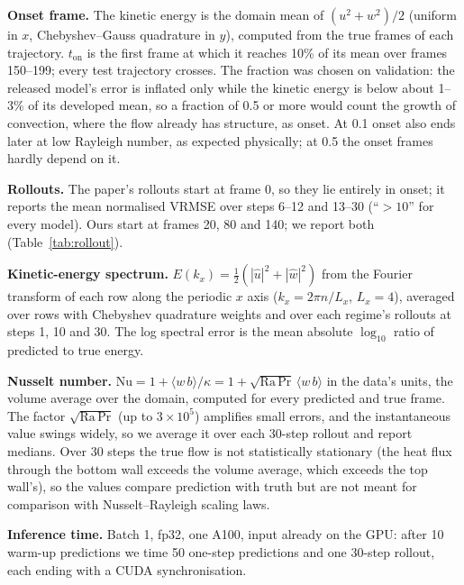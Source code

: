 \documentclass[11pt]{article}
\begin{document}
\textbf{Onset frame.} The kinetic energy is the domain mean of $(u^2+w^2)/2$ (uniform in $x$, Chebyshev--Gauss
quadrature in $y$), computed from the true frames of each trajectory. $t_{\mathrm{on}}$ is the first frame at which it
reaches 10\% of its mean over frames 150--199; every test trajectory crosses. The fraction was chosen on validation:
the released model's error is inflated only while the kinetic energy is below about 1--3\% of its developed mean, so a
fraction of 0.5 or more would count the growth of convection, where the flow already has structure, as onset. At 0.1
onset also ends later at low Rayleigh number, as expected physically; at 0.5 the onset frames hardly depend on it.

\textbf{Rollouts.} The paper's rollouts start at frame 0, so they lie entirely in onset; it reports the mean
normalised VRMSE over steps 6--12 and 13--30 (``$>10$'' for every model). Ours start at frames 20, 80 and 140; we
report both (Table~\ref{tab:rollout}).

\textbf{Kinetic-energy spectrum.} $E(k_x)=\tfrac12(|\hat u|^2+|\hat w|^2)$ from the Fourier transform of each row
along the periodic $x$ axis ($k_x=2\pi n/L_x$, $L_x=4$), averaged over rows with Chebyshev quadrature weights and
over each regime's rollouts at steps 1, 10 and 30. The log spectral error is the mean absolute $\log_{10}$ ratio of
predicted to true energy.

\textbf{Nusselt number.} $\mathrm{Nu}=1+\langle w\,b\rangle/\kappa = 1+\sqrt{\mathrm{Ra}\,\mathrm{Pr}}\,\langle
w\,b\rangle$ in the data's units, the volume average over the domain, computed for every predicted and true frame. The
factor $\sqrt{\mathrm{Ra}\,\mathrm{Pr}}$ (up to $3\times10^5$) amplifies small errors, and the instantaneous value
swings widely, so we average it over each 30-step rollout and report medians. Over 30 steps the true flow is not
statistically stationary (the heat flux through the bottom wall exceeds the volume average, which exceeds the top
wall's), so the values compare prediction with truth but are not meant for comparison with Nusselt--Rayleigh scaling
laws.

\textbf{Inference time.} Batch 1, fp32, one A100, input already on the GPU: after 10 warm-up predictions we time 50
one-step predictions and one 30-step rollout, each ending with a CUDA synchronisation.
\end{document}
